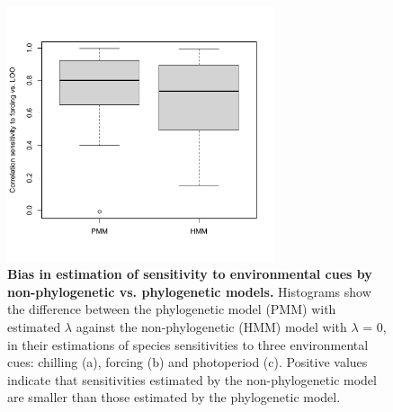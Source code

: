 \documentclass{article}
\begin{document}
\begin{figure}
  \centering
\noindent \includegraphics[width=0.7\textwidth]{../../analyses/phylogeny/figures/FigSXXX_LOO_cors_sensitivity_forcing.pdf}
  \caption{\textbf{Bias in estimation of sensitivity to environmental cues by non-phylogenetic vs. phylogenetic models.} Histograms show the difference between the phylogenetic model (PMM) with estimated $\lambda$ against the non-phylogenetic (HMM) model with $\lambda$ = 0, in their estimations of species sensitivities to three environmental cues: chilling (a), forcing (b) and photoperiod (c). Positive values indicate that sensitivities estimated by the non-phylogenetic model are smaller than those estimated by the phylogenetic model.}
  \label{fig:LOCO_slopescors}
\end{figure}
\end{document}
